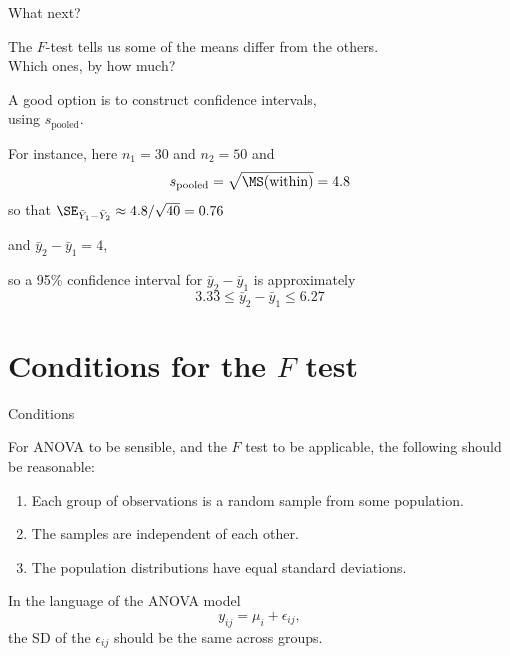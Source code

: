   \begin{frame}{What next?}

      The $F$-test tells us some of the means differ from the others. \\
      \alert{Which ones, by how much?}

    \vspace{2em}

    A good option is to construct \alert{confidence intervals},\\
    using $s_\text{pooled}$.

    \vspace{2em}

    For instance, here $n_1=30$ and $n_2=50$ and
    \[
    s_\text{pooled} = \sqrt{\MS(\text{within})} = 4.8
    \]
    so that $\SE_{\bar Y_1 - \bar Y_2} \approx 4.8 / \sqrt{40} =0.76$

    \vspace{1em}

    and $\bar y_2 - \bar y_1 = 4$,

    \vspace{1em}

    so a 95\% confidence interval for $\bar y_2 - \bar y_1$ is approximately
    \[
  3.33 \le \bar y_2 - \bar y_1 \le 6.27
  \]


  \end{frame}


\section{Conditions for the $F$ test}


\begin{frame}{Conditions}

    For ANOVA to be sensible, and the $F$ test to be applicable, the following should be reasonable:
    \begin{enumerate}
        \item Each group of observations is a random sample from some population.
        \item The samples are independent of each other.
        \item The population distributions have equal standard deviations.
    \end{enumerate}

    \vspace{2em}

    In the language of the ANOVA model
    \[
        y_{ij} = \mu_i + \epsilon_{ij} ,
    \]
    the SD of the $\epsilon_{ij}$ should be the same across groups.


\end{frame}



